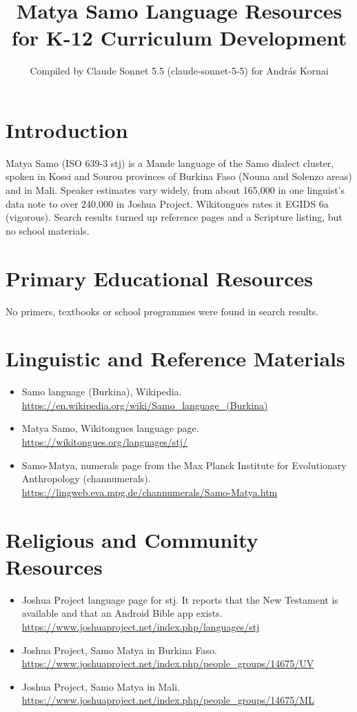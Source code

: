 \documentclass[12pt]{article}
\title{Matya Samo Language Resources for K-12 Curriculum Development}
\author{Compiled by Claude Sonnet 5.5 (claude-sonnet-5-5) for Andr\'as Kornai}
\date{}
\begin{document}
\maketitle

\section{Introduction}
Matya Samo (ISO 639-3 stj) is a Mande language of the Samo dialect cluster, spoken in Kossi and Sourou provinces of Burkina Faso (Nouna and Solenzo areas) and in Mali. Speaker estimates vary widely, from about 165,000 in one linguist's data note to over 240,000 in Joshua Project. Wikitongues rates it EGIDS 6a (vigorous). Search results turned up reference pages and a Scripture listing, but no school materials.

\section{Primary Educational Resources}
No primers, textbooks or school programmes were found in search results.

\section{Linguistic and Reference Materials}
\begin{itemize}
\item Samo language (Burkina), Wikipedia. \url{https://en.wikipedia.org/wiki/Samo_language_(Burkina)}
\item Matya Samo, Wikitongues language page. \url{https://wikitongues.org/languages/stj/}
\item Samo-Matya, numerals page from the Max Planck Institute for Evolutionary Anthropology (channumerals). \url{https://lingweb.eva.mpg.de/channumerals/Samo-Matya.htm}
\end{itemize}

\section{Religious and Community Resources}
\begin{itemize}
\item Joshua Project language page for stj. It reports that the New Testament is available and that an Android Bible app exists. \url{https://www.joshuaproject.net/index.php/languages/stj}
\item Joshua Project, Samo Matya in Burkina Faso. \url{https://www.joshuaproject.net/index.php/people_groups/14675/UV}
\item Joshua Project, Samo Matya in Mali. \url{https://www.joshuaproject.net/index.php/people_groups/14675/ML}
\end{itemize}
\end{document}
